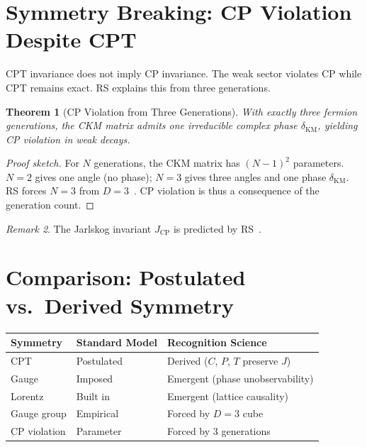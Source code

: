 \documentclass[12pt,a4paper]{article}
\newtheorem{theorem}{Theorem}[section]
\theoremstyle{definition}
\theoremstyle{remark}
\newtheorem{remark}[theorem]{Remark}
\begin{document}
\section{Symmetry Breaking: CP Violation Despite CPT}
\label{sec:symmetry-breaking}

CPT invariance does not imply CP invariance.  The weak sector violates CP
while CPT remains exact.  RS explains this from three generations.

\begin{theorem}[CP Violation from Three Generations]
\label{thm:cp-violation}
With exactly three fermion generations, the CKM matrix admits one irreducible
complex phase $\delta_{\mathrm{KM}}$, yielding CP violation in weak decays.
\end{theorem}

\begin{proof}[Proof sketch]
For $N$ generations, the CKM matrix has $(N-1)^2$ parameters.  $N=2$ gives
one angle (no phase); $N=3$ gives three angles and one phase
$\delta_{\mathrm{KM}}$.  RS forces $N=3$ from $D=3$~\cite{RSThreeGen}.  CP
violation is thus a consequence of the generation count.
\end{proof}

\begin{remark}
The Jarlskog invariant $J_{\mathrm{CP}}$ is predicted by RS~\cite{RSCKM}.
\end{remark}

\section{Comparison: Postulated vs.\ Derived Symmetry}
\label{sec:comparison}

\begin{center}
\begin{tabular}{lll}
\hline
Symmetry & Standard Model & Recognition Science \\
\hline
CPT & Postulated & Derived ($C$, $P$, $T$ preserve $J$) \\
Gauge & Imposed & Emergent (phase unobservability) \\
Lorentz & Built in & Emergent (lattice causality) \\
Gauge group & Empirical & Forced by $D=3$ cube \\
CP violation & Parameter & Forced by 3 generations \\
\hline
\end{tabular}
\end{center}
\end{document}
